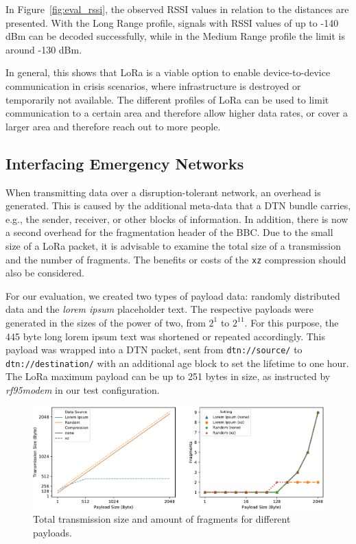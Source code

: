 In Figure~\ref{fig:eval_rssi}, the observed RSSI values in relation to the distances are presented.
With the Long Range profile, signals with RSSI values of up to -140 dBm can be decoded successfully, while in the Medium Range profile the limit is around -130 dBm.

In general, this shows that LoRa is a viable option to enable device-to-device communication in crisis scenarios, where infrastructure is destroyed or temporarily not available.
The different profiles of LoRa can be used to limit communication to a certain area and therefore allow higher data rates, or cover a larger area and therefore reach out to more people. 


\subsection{Interfacing Emergency Networks}
When transmitting data over a disruption-tolerant network, an overhead is generated.
This is caused by the additional meta-data that a DTN bundle carries, e.g., the sender, receiver, or other blocks of information.
In addition, there is now a second overhead for the fragmentation header of the BBC.
Due to the small size of a LoRa packet, it is advisable to examine the total size of a transmission and the number of fragments.
The benefits or costs of the \texttt{xz} compression should also be considered.

For our evaluation, we created two types of payload data: randomly distributed data and the \emph{lorem ipsum} placeholder text.
The respective payloads were generated in the sizes of the power of two, from $2^1$ to $2^{11}$.
For this purpose, the 445 byte long lorem ipsum text was shortened or repeated accordingly.
This payload was wrapped into a DTN packet, sent from \texttt{dtn://source/} to \texttt{dtn://destination/} with an additional age block to set the lifetime to one hour.
The LoRa maximum payload can be up to 251 bytes in size, as instructed by \textit{rf95modem} in our test configuration.

\begin{figure}[ht!]
    \centering
    \includegraphics[width=\columnwidth]{gfx/dtn7-bbc-eval.pdf}
    \caption{Total transmission size and amount of fragments for different payloads.}
    \label{fig:dtn7_bbc_eval}
\end{figure}

